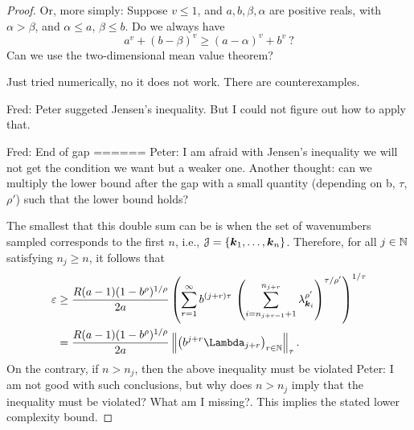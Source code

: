 \documentclass[USenglish]{article}
\theoremstyle{dgthm}
\theoremstyle{dgthm}
\theoremstyle{dgthm}
\theoremstyle{dgthm}
\theoremstyle{dgdef}
\theoremstyle{definition}
\newcommand{\norm}[2][{}]{\ensuremath{\left \lVert #2 \right \rVert}_{#1}}
\newcommand{\FredNote}[1]{{\color{blue}Fred: #1}}
\newcommand{\PeterNote}[1]{{\color{orange}Peter: #1}}
\begin{document}
\begin{proof}
{Or, more simply: Suppose $v\le 1$, and $a,b,\beta,\alpha$ are positive reals, with $\alpha>\beta$, 
and $\alpha\le a$, $\beta\le b$. 
Do we always have
\[
 a^v + (b-\beta)^v \ge (a-\alpha)^v + b^v\ ?
\]
Can we use the two-dimensional mean value theorem?

Just tried numerically, no it does not work. There are counterexamples.
}

\FredNote{Peter suggeted Jensen's inequality.  But I could not figure out how to apply that.
}


\FredNote{End of gap ======}
\PeterNote{I am afraid with Jensen's inequality we will not get the condition we want but a weaker one. Another thought: can we multiply the lower bound after the gap with a small quantity (depending on b, $\tau$, $\rho'$) such that the lower bound holds?}


The smallest that this double sum can be is when the set of wavenumbers sampled corresponds to the first $n$, i.e., ${\mathcal{J}} = \{{\boldsymbol{k}}_1, \ldots, {\boldsymbol{k}}_n\}$.  Therefore, for all $j \in {\mathbb{N}}$ satisfying $n_{j} \ge n$, it follows that 
\begin{align*}
    \varepsilon & \ge \frac{R(a-1)(1 - b^\rho)^{1/\rho}}{2a} \left(\sum_{r=1}^\infty b^{(j+r)\tau}  \, \left(\sum_{i=n_{j+r-1}+1}^{n_{j+r}}  \lambda_{\bsk_i}^{\rho'} \right)^{\tau/\rho'} \right)^{1/\tau} \\
    & = \frac{R(a-1)(1 - b^\rho)^{1/\rho}}{2a} \norm[\tau]{\bigl(b^{j+r} \Lambda_{j+r} \bigr)_{r \in \N}}.
\end{align*}
On the contrary, if $n > n_j$, then the above inequality must be violated \PeterNote{I am not good with such conclusions, but why does $n> n_j$ imply that the inequality must be violated? What am I missing?}.  This implies the stated lower complexity bound. 


\end{proof}



\medskip
\end{document}
